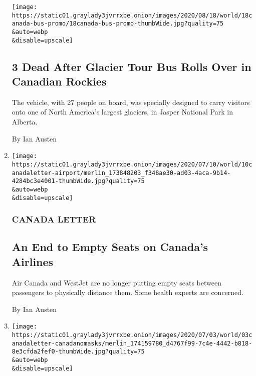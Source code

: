 \begin{enumerate}
  \texttt{[image: https://static01.graylady3jvrrxbe.onion/images/2020/08/18/world/18canada-bus-promo/18canada-bus-promo-thumbWide.jpg?quality=75\\\&auto=webp\\\&disable=upscale]}

  \hypertarget{3-dead-after-glacier-tour-bus-rolls-over-in-canadian-rockies}{%
  \subsection{3 Dead After Glacier Tour Bus Rolls Over in Canadian
  Rockies}\label{3-dead-after-glacier-tour-bus-rolls-over-in-canadian-rockies}}

  The vehicle, with 27 people on board, was specially designed to carry
  visitors onto one of North America's largest glaciers, in Jasper
  National Park in Alberta.

  By Ian Austen
\item
  \href{/2020/07/10/world/canada/canada-airlines-coronavirus.html}{}

  \texttt{[image: https://static01.graylady3jvrrxbe.onion/images/2020/07/10/world/10canadaletter-airport/merlin\_173848203\_f348ae30-ad03-4aca-9b14-4284bc3e4001-thumbWide.jpg?quality=75\\\&auto=webp\\\&disable=upscale]}

  \hypertarget{canada-letter-2}{%
  \subsubsection{CANADA LETTER}\label{canada-letter-2}}

  \hypertarget{an-end-to-empty-seats-on-canadas-airlines}{%
  \subsection{An End to Empty Seats on Canada's
  Airlines}\label{an-end-to-empty-seats-on-canadas-airlines}}

  Air Canada and WestJet are no longer putting empty seats between
  passengers to physically distance them. Some health experts are
  concerned.

  By Ian Austen
\item
  \href{/2020/07/03/world/canada/sorting-out-canadas-patchwork-of-face-mask-rules.html}{}

  \texttt{[image: https://static01.graylady3jvrrxbe.onion/images/2020/07/03/world/03canadaletter-canadanomasks/merlin\_174159780\_d4767f99-7c4e-4442-b818-8e3cfda2fef0-thumbWide.jpg?quality=75\\\&auto=webp\\\&disable=upscale]}

  \hypertarget{canada-letter-3}{%
}
\end{enumerate}
